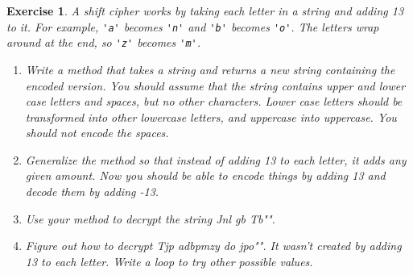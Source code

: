 \documentclass[12pt]{book}
\theoremstyle{exercise}
\newtheorem{exercise}{Exercise}[chapter]
\newcommand{\java}[1]{\verb"#1"}
\newcommand{\java}[1]{\lstinline{#1}} %
\begin{document}
\begin{exercise}

A {\em shift cipher} works by taking each letter in a string and adding 13 to it.
For example, \java{'a'} becomes \java{'n'} and \java{'b'} becomes \java{'o'}.
The letters wrap around at the end, so \java{'z'} becomes \java{'m'}.

\begin{enumerate}

\item Write a method that takes a string and returns a new string containing the encoded version.
You should assume that the string contains upper and lower case letters and spaces, but no other characters.
Lower case letters should be transformed into other lowercase letters, and uppercase into uppercase.
You should not encode the spaces.

\item Generalize the method so that instead of adding 13 to each letter, it adds any given amount.
Now you should be able to encode things by adding 13 and decode them by adding -13.

\item Use your method to decrypt the string \java{"Jnl gb Tb"}.

\item Figure out how to decrypt \java{"Tjp adbpmzy do jpo"}.
It wasn't created by adding 13 to each letter.
Write a loop to try other possible values.

\end{enumerate}

\end{exercise}


%
%
%
%
%
%
%

\backmatter
\appendix

%
%
%
%

\printindex
\cleardoublepage
\end{document}
